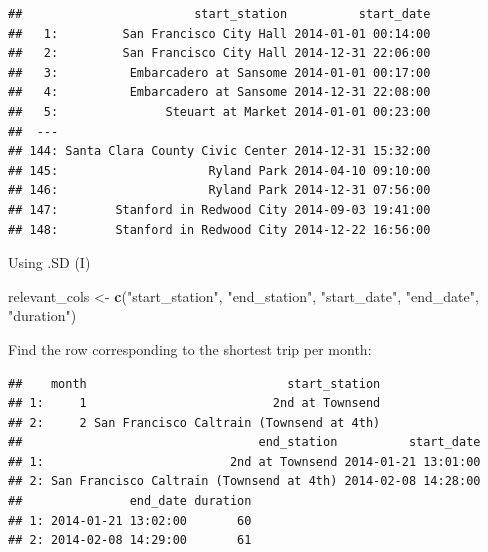 \documentclass[]{book}
\newenvironment{Shaded}{\begin{snugshade}}{\end{snugshade}}
\newcommand{\DecValTok}[1]{\textcolor[rgb]{0.00,0.00,0.81}{#1}}
\newcommand{\KeywordTok}[1]{\textcolor[rgb]{0.13,0.29,0.53}{\textbf{#1}}}
\newcommand{\NormalTok}[1]{#1}
\newcommand{\OperatorTok}[1]{\textcolor[rgb]{0.81,0.36,0.00}{\textbf{#1}}}
\newcommand{\StringTok}[1]{\textcolor[rgb]{0.31,0.60,0.02}{#1}}
\begin{document}
\begin{verbatim}
##                        start_station          start_date
##   1:         San Francisco City Hall 2014-01-01 00:14:00
##   2:         San Francisco City Hall 2014-12-31 22:06:00
##   3:          Embarcadero at Sansome 2014-01-01 00:17:00
##   4:          Embarcadero at Sansome 2014-12-31 22:08:00
##   5:               Steuart at Market 2014-01-01 00:23:00
##  ---                                                    
## 144: Santa Clara County Civic Center 2014-12-31 15:32:00
## 145:                     Ryland Park 2014-04-10 09:10:00
## 146:                     Ryland Park 2014-12-31 07:56:00
## 147:        Stanford in Redwood City 2014-09-03 19:41:00
## 148:        Stanford in Redwood City 2014-12-22 16:56:00
\end{verbatim}

Using .SD (I)

\begin{Shaded}
\begin{Highlighting}[]
\NormalTok{relevant_cols <-}\StringTok{ }\KeywordTok{c}\NormalTok{(}\StringTok{"start_station"}\NormalTok{, }\StringTok{"end_station"}\NormalTok{, }
                   \StringTok{"start_date"}\NormalTok{, }\StringTok{"end_date"}\NormalTok{, }\StringTok{"duration"}\NormalTok{)}
\end{Highlighting}
\end{Shaded}

Find the row corresponding to the shortest trip per month:

\begin{Shaded}
\end{Shaded}

\begin{verbatim}
##    month                            start_station
## 1:     1                          2nd at Townsend
## 2:     2 San Francisco Caltrain (Townsend at 4th)
##                                 end_station          start_date
## 1:                          2nd at Townsend 2014-01-21 13:01:00
## 2: San Francisco Caltrain (Townsend at 4th) 2014-02-08 14:28:00
##               end_date duration
## 1: 2014-01-21 13:02:00       60
## 2: 2014-02-08 14:29:00       61
\end{verbatim}
\end{document}
